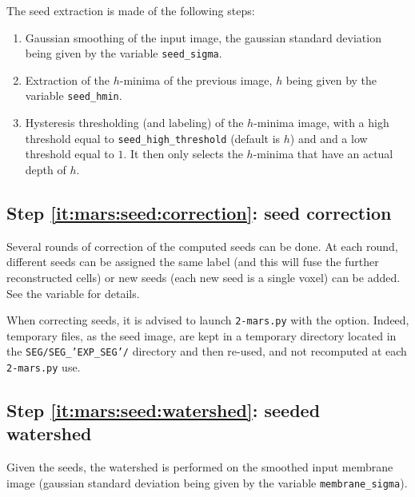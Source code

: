 The seed extraction is made of the following steps:
\begin{enumerate}
\itemsep -0.5ex
\item Gaussian smoothing of the input image, the gaussian standard deviation being given by the variable \texttt{seed\_sigma}.
\item Extraction of the $h$-minima of the previous image, $h$  being given by the variable \texttt{seed\_hmin}.
\item Hysteresis thresholding (and labeling)  of the $h$-minima image, with a high threshold equal to \texttt{seed\_high\_threshold} (default is $h$)  and and a low threshold equal to $1$. It then only selects the $h$-minima that have an actual depth of $h$.
\end{enumerate}


\subsection{Step \ref{it:mars:seed:correction}: seed correction}
\label{sec:cli:mars:seed:correction}

Several rounds of correction of the computed seeds can be done. At each round, different seeds can be assigned the same label (and this will fuse the further reconstructed cells) or new seeds (each new seed is a single voxel) can be added. See the  variable for details.

When correcting seeds, it is advised to launch \texttt{2-mars.py}  with the  option. Indeed, temporary files, as the seed image, are kept in a temporary directory located in the \texttt{SEG/SEG\_'EXP\_SEG'/} directory and then re-used, and not recomputed at each \texttt{2-mars.py} use.




\subsection{Step \ref{it:mars:seed:watershed}: seeded watershed}


Given the seeds, the watershed is performed on the smoothed input membrane image (gaussian standard deviation being given by the variable \texttt{membrane\_sigma}).



